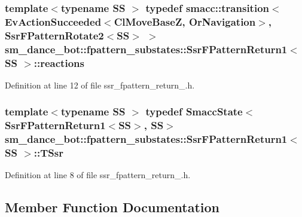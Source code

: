 \subsubsection[{\texorpdfstring{reactions}{reactions}}]{\setlength{\rightskip}{0pt plus 5cm}template$<$typename SS $>$ typedef {\bf smacc\+::transition}$<$Ev\+Action\+Succeeded$<${\bf Cl\+Move\+BaseZ}, {\bf Or\+Navigation}$>$, {\bf Ssr\+F\+Pattern\+Rotate2}$<$SS$>$ $>$ {\bf sm\+\_\+dance\+\_\+bot\+::fpattern\+\_\+substates\+::\+Ssr\+F\+Pattern\+Return1}$<$ SS $>$\+::{\bf reactions}}\hypertarget{structsm__dance__bot_1_1fpattern__substates_1_1SsrFPatternReturn1_ac172f5873bf6466a13b6e3a32cb64fff}{}\label{structsm__dance__bot_1_1fpattern__substates_1_1SsrFPatternReturn1_ac172f5873bf6466a13b6e3a32cb64fff}


Definition at line 12 of file ssr\+\_\+fpattern\+\_\+return\+\_.\+h.

\subsubsection[{\texorpdfstring{T\+Ssr}{TSsr}}]{\setlength{\rightskip}{0pt plus 5cm}template$<$typename SS $>$ typedef {\bf Smacc\+State}$<${\bf Ssr\+F\+Pattern\+Return1}$<$SS$>$, SS$>$ {\bf sm\+\_\+dance\+\_\+bot\+::fpattern\+\_\+substates\+::\+Ssr\+F\+Pattern\+Return1}$<$ SS $>$\+::{\bf T\+Ssr}}\hypertarget{structsm__dance__bot_1_1fpattern__substates_1_1SsrFPatternReturn1_a93f24753013f0801c2d311b8535a9127}{}\label{structsm__dance__bot_1_1fpattern__substates_1_1SsrFPatternReturn1_a93f24753013f0801c2d311b8535a9127}


Definition at line 8 of file ssr\+\_\+fpattern\+\_\+return\+\_.\+h.



\subsection{Member Function Documentation}
